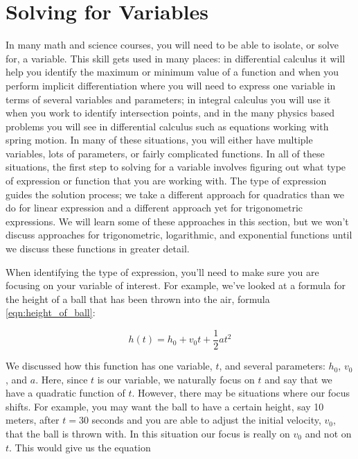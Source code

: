 \section{Solving for Variables}\label{sec:solving_for_variables}


In many math and science courses, you will need to be able to isolate, or solve for, a variable. This skill gets used in many places: in differential calculus it will help you identify the maximum or minimum value of a function and when you perform implicit differentiation where you will need to express one variable in terms of several variables and parameters; in integral calculus you will use it when you work to identify intersection points, and in the many physics based problems you will see in differential calculus such as equations working with spring motion. In many of these situations, you will either have multiple variables, lots of parameters, or fairly complicated functions. In all of these situations, the first step to solving for a variable involves figuring out what type of expression or function that you are working with. The type of expression guides the solution process; we take a different approach for quadratics than we do for linear expression and a different approach yet for trigonometric expressions. We will learn some of these approaches in this section, but we won't discuss approaches for trigonometric, logarithmic, and exponential functions until we discuss these functions in greater detail.

When identifying the type of expression, you'll need to make sure you are focusing on your variable of interest. For example, we've looked at a formula for the height of a ball that has been thrown into the air, formula \ref{eqn:height_of_ball}:

\begin{equation*}
	h(t)=h_0+v_0 t +\frac{1}{2}a t^2
\end{equation*}

\noindent
We discussed how this function has one variable, $t$, and several parameters: $h_0$, $v_0$, and $a$. Here, since $t$ is our variable, we naturally focus on $t$ and say that we have a quadratic function of $t$. However, there may be situations where our focus shifts. For example, you may want the ball to have a certain height, say 10 meters, after $t=30$ seconds and you are able to adjust the initial velocity, $v_0$, that the ball is thrown with. In this situation our focus is really on $v_0$ and not on $t$. This would give us the equation

